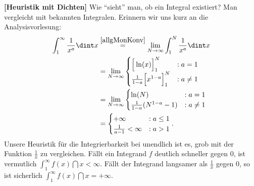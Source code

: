 \begin{bem}
 \textbf{[Heuristik mit Dichten]}
	Wie \enquote{sieht} man, ob ein Integral existiert? Man vergleicht mit bekannten Integralen. Erinnern wir uns kurz an die Analysisvorlesung:
	\begin{align*}
		\int_{1}^{\infty} \frac{1}{x^a} \dint x &\overset{\ref{allgMonKonv}}{=} \lim\limits_{N \to \infty} \int_{1}^{N} \frac{1}{x^a} \dint x\\
		&= \lim\limits_{N \to \infty} \begin{cases}
		\Big[\ln(x)\Big]_1^N&:a = 1\\
		\frac{1}{1-a}\Big[x^{1-a}\Big]_1^N&:a \neq 1
		\end{cases}\\
		&= \lim\limits_{N \to \infty} \begin{cases}
		\ln(N)&:a = 1\\
		\frac{1}{1-a}(N^{1-a} - 1)&: a \neq 1
		\end{cases}\\
		&= \begin{cases}
		+\infty&:a \leq 1\\
		\frac{1}{a - 1} < \infty&:a > 1
		\end{cases}.
	\end{align*}
	Unsere Heuristik f\"ur die Integrierbarkeit bei unendlich ist es, grob mit der Funktion $\frac 1 x$ zu vergleichen. F\"allt ein Integrand $f$ deutlich schneller gegen $0$, ist vermutlich $\int_{1}^{\infty} f(x) \dint x < \infty$. F\"allt der Integrand langsamer als $\frac 1 x$ gegen $0$, so ist sicherlich $\int_{1}^{\infty} f(x) \dint x = + \infty$.\smallskip
	

\end{bem}

